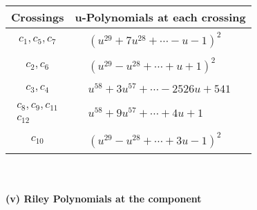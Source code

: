 \documentclass[1p]{elsarticle_modified}
\theoremstyle{definition}
\begin{document}
\begin{tabular}{m{50pt}|m{274pt}}
Crossings & \hspace{64pt}u-Polynomials at each crossing \\
\hline $$\begin{aligned}c_{1},c_{5},c_{7}\end{aligned}$$&$\begin{aligned}
&(u^{29}+7 u^{28}+\cdots- u-1)^{2}
\end{aligned}$\\
\hline $$\begin{aligned}c_{2},c_{6}\end{aligned}$$&$\begin{aligned}
&(u^{29}- u^{28}+\cdots+u+1)^{2}
\end{aligned}$\\
\hline $$\begin{aligned}c_{3},c_{4}\end{aligned}$$&$\begin{aligned}
&u^{58}+3 u^{57}+\cdots-2526 u+541
\end{aligned}$\\
\hline $$\begin{aligned}c_{8},c_{9},c_{11}\\c_{12}\end{aligned}$$&$\begin{aligned}
&u^{58}+9 u^{57}+\cdots+4 u+1
\end{aligned}$\\
\hline $$\begin{aligned}c_{10}\end{aligned}$$&$\begin{aligned}
&(u^{29}- u^{28}+\cdots+3 u-1)^{2}
\end{aligned}$\\
\hline
\end{tabular}\\~\\
\newpage\renewcommand{\arraystretch}{1}
\flushleft \textbf{(v) Riley Polynomials at the component}\newline \\
\end{document}
